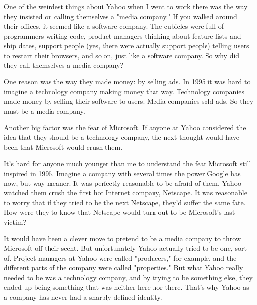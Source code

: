One
                    of the weirdest things about Yahoo when I went to work there
                    was the way they insisted on calling themselves a "media
                    company." If you walked around their offices, it seemed like
                    a software company. The cubicles were full of programmers
                    writing code, product managers thinking about feature lists
                    and ship dates, support people (yes, there were actually
                    support people) telling users to restart their browsers, and
                    so on, just like a software company. So why did they call
                    themselves a media company?

One reason was the
                    way they made money: by selling ads. In 1995 it was hard to
                    imagine a technology company making money that way.
                    Technology companies made money by selling their software to
                    users. Media companies sold ads. So they must be a media
                    company.

Another big factor was the fear of
                    Microsoft. If anyone at Yahoo considered the idea that they
                    should be a technology company, the next thought would have
                    been that Microsoft would crush them.

It's hard
                    for anyone much younger than me to understand the fear
                    Microsoft still inspired in 1995. Imagine a company with
                    several times the power Google has now, but way meaner. It
                    was perfectly reasonable to be afraid of them. Yahoo watched
                    them crush the first hot Internet company, Netscape. It was
                    reasonable to worry that if they tried to be the next
                    Netscape, they'd suffer the same fate. How were they to know
                    that Netscape would turn out to be Microsoft's last
                    victim?

It would have been a clever move to
                    pretend to be a media company to throw Microsoft off their
                    scent. But unfortunately Yahoo actually tried to be one,
                    sort of. Project managers at Yahoo were called "producers,"
                    for example, and the different parts of the company were
                    called "properties." But what Yahoo really needed to be was
                    a technology company, and by trying to be something else,
                    they ended up being something that was neither here nor
                    there. That's why Yahoo as a company has never had a sharply
                    defined identity.

